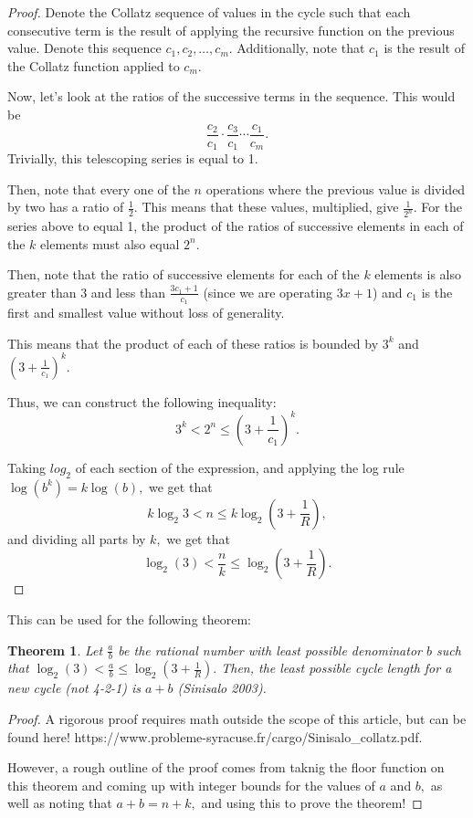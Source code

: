 \documentclass{article}
\newtheorem{theorem}{Theorem}
\theoremstyle{remark}
\theoremstyle{problem}
\numberwithin{problem}{subsection}
\numberwithin{Problem}{section}
\theoremstyle{definition}
\theoremstyle{definition}
\theoremstyle{definition}
\begin{document}
\begin{proof}
    Denote the Collatz sequence of values in the cycle such that each consecutive term is the result of applying the recursive function on the previous value. Denote this sequence $ c_1, c_2, \hdots , c_m.$ Additionally, note that $c_1$ is the result of the Collatz function applied to $c_m.$

    Now, let's look at the ratios of the successive terms in the sequence. This would be $$\frac{c_2}{c_1} \cdot \frac{c_3}{c_1} \cdots \frac{c_1}{c_m}.$$ Trivially, this telescoping series is equal to 1.

    Then, note that every one of the $n$ operations where the previous value is divided by two has a ratio of $\frac{1}{2}.$ This means that these values, multiplied, give $\frac{1}{2^n}.$ For the series above to equal 1, the product of the ratios of successive elements in each of the $k$ elements must also equal $2^{n}.$

    Then, note that the ratio of successive elements for each of the $k$ elements is also greater than $3$ and less than $\frac{3 c_1 + 1}{c_1}$ (since we are operating $3x + 1$) and $c_1$ is the first and smallest value without loss of generality. 

    This means that the product of each of these ratios is bounded by $3^k$ and $\left( 3 + \frac{1}{c_1} \right)^k.$

    Thus, we can construct the following inequality: $$3^k < 2^n \leq \left( 3 + \frac{1}{c_1} \right)^k. $$

    Taking $log_{2}$ of each section of the expression, and applying the log rule $ \log (b^k) = k \log (b),$ we get that $$ k \log_{2}{3} < n \leq k \log_{2} \left( 3 + \frac{1}{R} \right),$$ and dividing all parts by $k,$ we get that $$ \log_{2}(3) < \frac{n}{k} \leq \log_{2} \left( 3 + \frac{1}{R} \right).$$

\end{proof}

This can be used for the following theorem:

\begin{theorem}
     Let $\frac{a}{b}$ be the rational number with least possible denominator $b$ such that $ \log_{2}(3) < \frac{a}{b} \leq \log_{2} \left( 3 + \frac{1}{R} \right).$ Then, the least possible cycle length for a new cycle (not 4-2-1) is $a + b$ (Sinisalo 2003).
\end{theorem}
    
\begin{proof}
    A rigorous proof requires math outside the scope of this article, but can be found here! https://www.probleme-syracuse.fr/cargo/Sinisalo\_collatz.pdf. 

    However, a rough outline of the proof comes from taknig the floor function on this theorem and coming up with integer bounds for the values of $a$ and $b,$ as well as noting that $a + b = n + k,$ and using this to prove the theorem!
\end{proof}
\end{document}
